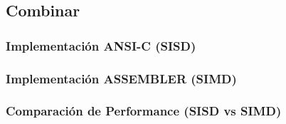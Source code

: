     \subsection{Combinar}
        \subsubsection{Implementación ANSI-C (SISD)}
        \subsubsection{Implementación ASSEMBLER (SIMD)}
        \subsubsection{Comparación de Performance (SISD vs SIMD)}
